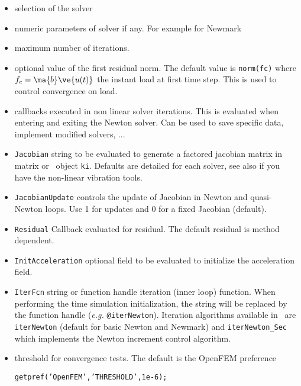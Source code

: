 \begin{itemize}
\item {} selection of the solver
\item {}   numeric parameters of solver if any. For example for Newmark
  \\

\item {}  maximum number of iterations.   
\item {}  optional value of the first residual norm. The default value is {\tt norm(fc)} where $f_c=\ma{b}\ve{u(t)}$ the instant load at first time step. This is used to control convergence on load. 
\item {} callbacks executed in non linear solver iterations. This is evaluated when entering and exiting the Newton solver. Can be used to save specific data, implement modified solvers, ...

\item {\tt Jacobian}  string to be evaluated to generate a factored jacobian matrix in matrix or \ofact\ object {\tt ki}. Defaults are detailed for each solver, see also  if you have the non-linear vibration tools.

\item {\tt JacobianUpdate}  controls the update of Jacobian in Newton and quasi-Newton loops. Use 1 for updates and 0 for a fixed Jacobian (default).
\item {\tt Residual}  Callback evaluated for residual. The default residual is method dependent.
\item {\tt InitAcceleration} optional field to be evaluated to initialize the acceleration field. 

\item {\tt IterFcn} string or function handle iteration (inner loop) function. When performing the time simulation initialization, the string will be replaced by the function handle ({\it e.g.} {\tt @iterNewton}). Iteration algorithms available in \fetime\ are {\tt iterNewton} (default for basic Newton and Newmark) and {\tt iterNewton\_Sec} which implements the Newton increment control algorithm. \\


\item {}  threshold for convergence tests. The default is the OpenFEM preference

{\tt getpref('OpenFEM','THRESHOLD',1e-6);}


\end{itemize}
